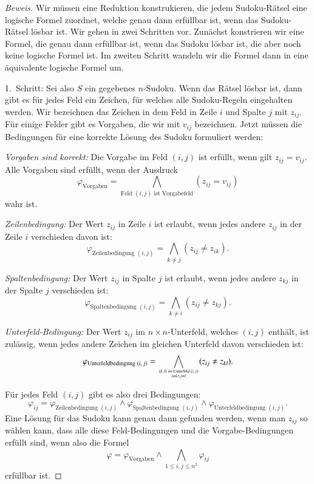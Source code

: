 \begin{proof}[Beweis]
Wir müssen eine Reduktion konstrukieren, die jedem Sudoku-Rätsel
eine logische Formel zuordnet, welche genau dann erfüllbar ist, wenn
das Sudoku-Rätsel lösbar ist.
Wir gehen in zwei Schritten vor.
Zunächst konstrieren wir eine Formel, die genau dann erfüllbar ist,
wenn das Sudoku lösbar ist, die aber noch keine logische Formel ist.
Im zweiten Schritt wandeln wir die Formel dann in eine äquivalente
logische Formel um.

1.~Schritt: Sei also $S$ ein gegebenes $n$-Sudoku.
Wenn das Rätsel lösbar
ist, dann gibt es für jedes Feld ein Zeichen, für welches alle Sudoku-Regeln
eingehalten werden.
Wir bezeichnen das Zeichen in dem Feld in Zeile $i$
und Spalte $j$ mit $z_{ij}$.
Für einige Felder gibt es Vorgaben, die wir mit
$v_{ij}$ bezeichnen.
Jetzt müssen die Bedingungen für eine korrekte
Lösung des Sudoku formuliert werden:
\begin{compactenum}
\item {\em Vorgaben sind korrekt:} Die Vorgabe im Feld $(i,j)$ ist erfüllt,
wenn gilt $z_{ij}=v_{ij}$.
Alle Vorgaben sind erfüllt, wenn der Ausdruck
\[
\varphi_{\text{Vorgaben}}=\bigwedge_{\text{Feld $(i,j)$ ist Vorgabefeld}}(z_{ij}=v_{ij})
\]
wahr ist.
\item {\em Zeilenbedingung:} Der Wert $z_{ij}$ in Zeile $i$ ist erlaubt,
wenn jedes andere $z_{ij}$ in der Zeile $i$ verschieden davon ist:
\[
\varphi_{\text{Zeilenbedingung $(i,j)$}}
=
\bigwedge_{k\ne j}(z_{ij}\ne z_{ik}).
\]
\item {\em Spaltenbedingung:} Der Wert $z_{ij}$ in Spalte $j$ ist erlaubt,
wenn jedes andere $z_{kj}$ in der Spalte $j$ verschieden ist:
\[
\varphi_{\text{Spaltenbedingung $(i,j)$}}
=
\bigwedge_{k\ne i}(z_{ij}\ne z_{kj}).
\]
\item {\em Unterfeld-Bedingung:} Der Wert $z_{ij}$ im $n\times n$-Unterfeld,
welches $(i,j)$ enthält, ist zulässig, wenn jedes andere Zeichen im gleichen
Unterfeld davon verschieden ist:
\[
\varphi_
{\text{Unterfeldbedingung $(i,j)$}}
=
\bigwedge_{\myatop{\text{$(k,l)$ im Unterfeld $(i,j)$}}{i\ne k\wedge j\ne l}}(z_{ij}\ne z_{kl}).
\]
\end{compactenum}
Für jedes Feld $(i,j)$ gibt es also drei Bedingungen:
\[
\varphi_{ij}=
\varphi_{\text{Zeilenbedingung $(i,j)$}}
\wedge
\varphi_{\text{Spaltenbedingung $(i,j)$}}
\wedge
\varphi_{\text{Unterfeldbedingung $(i,j)$}}.
\]
Eine Lösung für das Sudoku kann genau dann gefunden werden, wenn man
$z_{ij}$ so wählen kann, dass alle diese Feld-Bedingungen und die
Vorgabe-Bedingungen erfüllt sind, wenn also die Formel
\begin{equation}
\varphi=
\varphi_{\text{Vorgaben}}\wedge
\bigwedge_{1\le i,j\le n^2}
\varphi_{ij}
\label{sudoku-formel}
\end{equation}
erfüllbar ist.


\end{proof}
